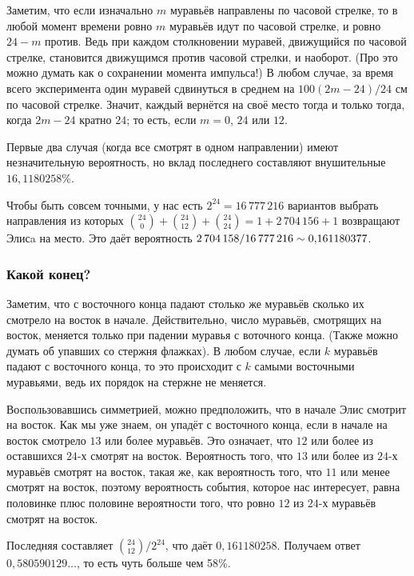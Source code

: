 Заметим, что если изначально $m$ муравьёв направлены по часовой стрелке, то в любой момент времени ровно $m$ муравьёв идут по часовой стрелке, и ровно $24 - m$ против.
Ведь при каждом столкновении муравей, движущийся по часовой стрелке, становится движущимся против часовой стрелки, и наоборот.
(Про это можно думать как о сохранении момента импульса!)
В любом случае, за время всего эксперимента один муравей сдвинуться в среднем на $100(2m - 24)/24$ см по часовой стрелке.
Значит, каждый вернётся на своё место тогда и только тогда, когда $2m - 24$ кратно $24$; то есть, если $m = 0$, $24$ или $12$.

Первые два случая (когда все смотрят в одном направлении) имеют незначительную вероятность, но вклад последнего составляют внушительные $16{,}1180258\%$. %

Чтобы быть совсем точными, у нас есть $2^{24}=16\,777\,216$ вариантов выбрать направления из которых  $\binom{24}0+\binom{24}{12}+\binom{24}{24}=1+2\,704\,156+1$ возвращают Элисa на место.
Это даёт вероятность $2\,704\,158/16\,777\,216 \z\sim 0{,}161180377$.

\subsubsection*{Какой конец?}

Заметим, что с восточного конца падают столько же муравьёв сколько их смотрело на восток в начале.
Действительно, число муравьёв, смотрящих на восток, меняется только при падении муравья с воточного конца.
(Также можно думать об упавших со стержня флажках).
В любом случае, если $k$ муравьёв падают с восточного конца, то это происходит с $k$ самыми восточными муравьями, ведь их порядок на стержне не меняется.

Воспользовавшись симметрией, можно предположить, что в начале Элис смотрит на восток.
Как мы уже знаем, он упадёт с восточного конца, если в начале на восток смотрело $13$ или более муравьёв.
Это означает, что $12$ или более из оставшихся $24$-х смотрят на восток.
Вероятность того, что $13$ или более из $24$-х муравьёв смотрят на восток, такая же, как вероятность того, что $11$ или менее смотрят на восток, поэтому вероятность события, которое нас интересует, равна половинке плюс половине вероятности того, что ровно $12$ из $24$-х муравьёв смотрят на восток.

Последняя составляет $\binom{24}{12}/2^{24}$, что даёт $0{,}161180258$.
Получаем ответ $0{,}580590129\dots$, то есть чуть больше чем 58\%.

